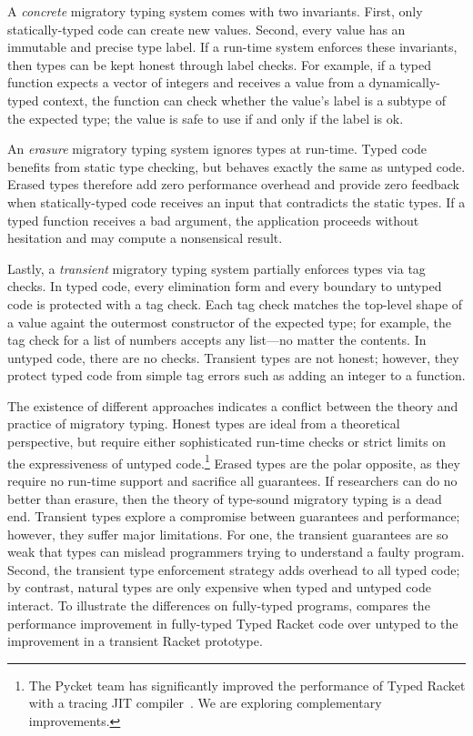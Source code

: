 A \emph{concrete}\/ migratory typing system comes with two invariants.
First, only statically-typed code can create new values.
Second, every value has an immutable and precise type label.
If a run-time system enforces these invariants, then types can be kept honest
 through label checks.
For example, if a typed function expects a vector of integers and receives
 a value from a dynamically-typed context, the function can check whether the
 value's label is a subtype of the expected type;
 the value is safe to use if and only if the label is ok.

An \emph{erasure}\/ migratory typing system ignores types at run-time.
Typed code benefits from static type checking, but behaves exactly the same
 as untyped code.
Erased types therefore add zero performance overhead and provide zero feedback
 when statically-typed code receives an input that contradicts the static
 types.
If a typed function receives a bad argument, the application proceeds without
 hesitation and may compute a nonsensical result.

Lastly, a \emph{transient}\/ migratory typing system partially enforces types
 via tag checks.
In typed code, every elimination form and every boundary to untyped code
 is protected with a tag check.
Each tag check matches the top-level shape of a value againt the outermost
 constructor of the expected type; for example, the tag check for a
 list of numbers accepts any list---no matter the contents.
In untyped code, there are no checks.
Transient types are not honest; however, they protect typed code from simple
 tag errors such as adding an integer to a function.

The existence of different approaches indicates a conflict between the theory
 and practice of migratory typing.
Honest types are ideal from a theoretical perspective, but require either
 sophisticated run-time checks or strict limits on the expressiveness of
 untyped code.\footnote{The Pycket team has significantly improved the performance
  of Typed Racket with a tracing JIT compiler~\cite{bbst-oopsla-2017}.
  We are exploring complementary improvements.}
Erased types are the polar opposite, as they require no run-time support
 and sacrifice all guarantees.
If researchers can do no better than erasure, then the theory of
 type-sound migratory typing is a dead end.
Transient types explore a compromise between guarantees and performance;
 however, they suffer major limitations.
For one, the transient guarantees are so weak that types can mislead
 programmers trying to understand a faulty program.
Second, the transient type enforcement strategy adds overhead to all typed code;
 by contrast, natural types are only expensive when typed and untyped code interact.
To illustrate the differences on fully-typed programs,
  compares the performance improvement
 in fully-typed Typed Racket code over untyped to the improvement in a
 transient Racket prototype.

